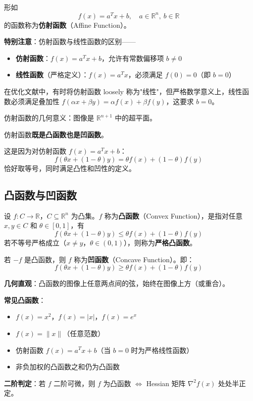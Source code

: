 \begin{definition}[仿射函数与线性函数]
形如
\[
f(x) = a^T x + b, \quad a \in \mathbb{R}^n,\ b \in \mathbb{R}
\]
的函数称为\textbf{仿射函数}（Affine Function）。

\textbf{特别注意}：仿射函数与线性函数的区别——
\begin{itemize}
    \item \textbf{仿射函数}：$f(x) = a^T x + b$，允许有常数偏移项 $b \neq 0$
    \item \textbf{线性函数}（严格定义）：$f(x) = a^T x$，必须满足 $f(0) = 0$（即 $b = 0$）
\end{itemize}

在优化文献中，有时将仿射函数 loosely 称为"线性"，但严格数学意义上，线性函数必须满足叠加性 $f(\alpha x + \beta y) = \alpha f(x) + \beta f(y)$，这要求 $b = 0$。

仿射函数的几何意义：图像是 $\mathbb{R}^{n+1}$ 中的超平面。
\end{definition}

\begin{property}[仿射函数的关键性质]
仿射函数\textbf{既是凸函数也是凹函数}。

这是因为对仿射函数 $f(x) = a^T x + b$：
\[
f(\theta x + (1-\theta)y) = \theta f(x) + (1-\theta) f(y)
\]
恰好取等号，同时满足凸性和凹性的定义。
\end{property}

\subsection{凸函数与凹函数}

\begin{definition}[凸函数]
设 $f: C \to \mathbb{R}$，$C \subseteq \mathbb{R}^n$ 为凸集。$f$ 称为\textbf{凸函数}（Convex Function），是指对任意 $x, y \in C$ 和 $\theta \in [0,1]$，有
\[
f(\theta x + (1-\theta) y) \leq \theta f(x) + (1-\theta) f(y)
\]
若不等号严格成立（$x \neq y$，$\theta \in (0,1)$），则称为\textbf{严格凸函数}。
\end{definition}

\begin{definition}[凹函数]
若 $-f$ 是凸函数，则 $f$ 称为\textbf{凹函数}（Concave Function）。即：
\[
f(\theta x + (1-\theta) y) \geq \theta f(x) + (1-\theta) f(y)
\]
\end{definition}

\begin{conceptbox}[凸函数的直观理解与判定]
\textbf{几何直观}：凸函数的图像上任意两点间的弦，始终在图像上方（或重合）。

\textbf{常见凸函数}：
\begin{itemize}[itemsep=0.2em]
    \item $f(x) = x^2$，$f(x) = |x|$，$f(x) = e^x$
    \item $f(x) = \|x\|$（任意范数）
    \item 仿射函数 $f(x) = a^T x + b$（当 $b=0$ 时为严格线性函数）
    \item 非负加权的凸函数之和仍为凸函数
\end{itemize}

\textbf{二阶判定}：若 $f$ 二阶可微，则 $f$ 为凸函数 $\Leftrightarrow$ Hessian 矩阵 $\nabla^2 f(x)$ 处处半正定。
\end{conceptbox}

